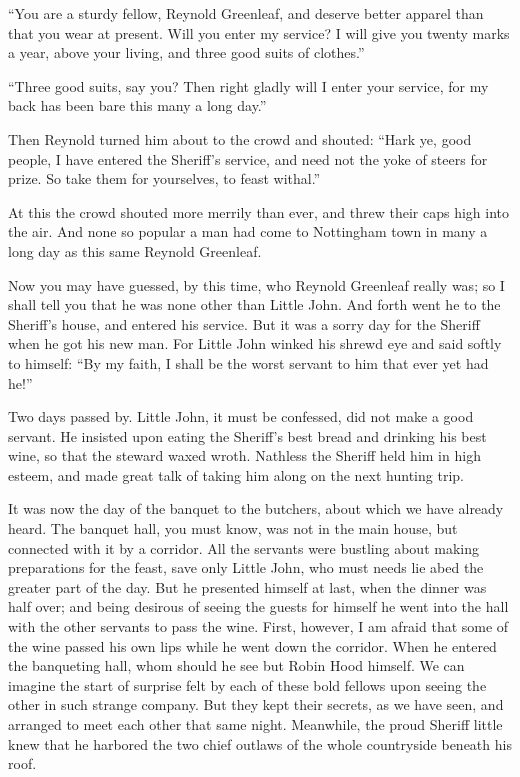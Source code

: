 ``You are a sturdy fellow, Reynold Greenleaf, and deserve better apparel
than that you wear at present. Will you enter my service? I will give
you twenty marks a year, above your living, and three good suits of
clothes.''

``Three good suits, say you? Then right gladly will I enter your
service, for my back has been bare this many a long day.''

Then Reynold turned him about to the crowd and shouted: ``Hark ye, good
people, I have entered the Sheriff's service, and need not the yoke of
steers for prize. So take them for yourselves, to feast withal.''

At this the crowd shouted more merrily than ever, and threw their caps
high into the air. And none so popular a man had come to Nottingham town
in many a long day as this same Reynold Greenleaf.

Now you may have guessed, by this time, who Reynold Greenleaf really
was; so I shall tell you that he was none other than Little John. And
forth went he to the Sheriff's house, and entered his service. But it
was a sorry day for the Sheriff when he got his new man. For Little John
winked his shrewd eye and said softly to himself: ``By my faith, I shall
be the worst servant to him that ever yet had he!''

Two days passed by. Little John, it must be confessed, did not make a
good servant. He insisted upon eating the Sheriff's best bread and
drinking his best wine, so that the steward waxed wroth. Nathless the
Sheriff held him in high esteem, and made great talk of taking him along
on the next hunting trip.

It was now the day of the banquet to the butchers, about which we have
already heard. The banquet hall, you must know, was not in the main
house, but connected with it by a corridor. All the servants were
bustling about making preparations for the feast, save only Little John,
who must needs lie abed the greater part of the day. But he presented
himself at last, when the dinner was half over; and being desirous of
seeing the guests for himself he went into the hall with the other
servants to pass the wine. First, however, I am afraid that some of the
wine passed his own lips while he went down the corridor. When he
entered the banqueting hall, whom should he see but Robin Hood himself.
We can imagine the start of surprise felt by each of these bold fellows
upon seeing the other in such strange company. But they kept their
secrets, as we have seen, and arranged to meet each other that same
night. Meanwhile, the proud Sheriff little knew that he harbored the two
chief outlaws of the whole countryside beneath his roof.

